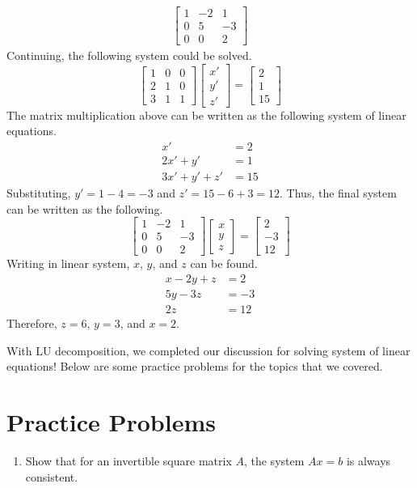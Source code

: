 \documentclass[../main.tex]{subfiles}
\begin{document}
\begin{solution}
\begin{align*}
\begin{bmatrix}
        1 & -2 & 1 \\
        0 & 5  & -3 \\
        0 & 0  & 2
    \end{bmatrix}
\end{align*}
Continuing, the following system could be solved.
\[
\begin{bmatrix}
    1 & 0 & 0 \\
    2 & 1 & 0 \\
    3 & 1 & 1
\end{bmatrix}
\begin{bmatrix}
    x' \\
    y' \\
    z'
\end{bmatrix}
=
\begin{bmatrix}
    2 \\
    1 \\
    15
\end{bmatrix}
\]
The matrix multiplication above can be written as the following
system of linear equations.
\begin{align*}
    x' &= 2 \\
    2x' + y' &= 1 \\
    3x' + y' + z' &= 15
\end{align*}
Substituting, $y' = 1 - 4 = -3$ and $z' = 15 - 6 + 3 = 12$. Thus,
the final system can be written as the following.
\[
\begin{bmatrix}
    1 & -2 & 1 \\
    0 & 5  & -3 \\
    0 & 0  & 2
\end{bmatrix}
\begin{bmatrix}
    x \\
    y \\
    z
\end{bmatrix}
=
\begin{bmatrix}
    2 \\
    -3 \\
    12
\end{bmatrix}
\]
Writing in linear system, $x$, $y$, and $z$ can be found.
\begin{align*}
    x - 2y + z &= 2 \\
    5y - 3z &= -3 \\
    2z &= 12
\end{align*}
Therefore, $z = 6$, $y = 3$, and $x = 2$.
\end{solution}

With LU decomposition, we completed our discussion for solving
system of linear equations! Below are some practice problems
for the topics that we covered.

\section{Practice Problems}
\begin{enumerate}
\item
Show that for an invertible square matrix $A$, the system $Ax = b$
is always consistent.
\end{enumerate}
\end{document}
